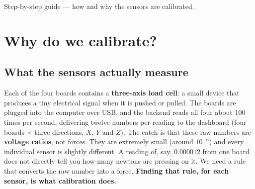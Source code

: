 \documentclass[11pt,a4paper]{article}
\begin{document}
%
  {Step-by-step guide --- how and why the sensors are calibrated.}

\section{Why do we calibrate?}

\subsection{What the sensors actually measure}
Each of the four boards contains a \textbf{three-axis load cell}: a small device
that produces a tiny electrical signal when it is pushed or pulled. The boards are
plugged into the computer over USB, and the backend reads all four about 100 times
per second, delivering twelve numbers per reading to the dashboard (four boards
$\times$ three directions, $X$, $Y$ and $Z$).
The catch is that these raw numbers are \textbf{voltage ratios}, not forces. They
are extremely small (around $10^{-6}$) and every individual sensor is slightly
different. A reading of, say, $0.000012$ from one board does not directly tell you
how many newtons are pressing on it. We need a rule that converts the raw number
into a force. \textbf{Finding that rule, for each sensor, is what calibration
does.}
\end{document}
